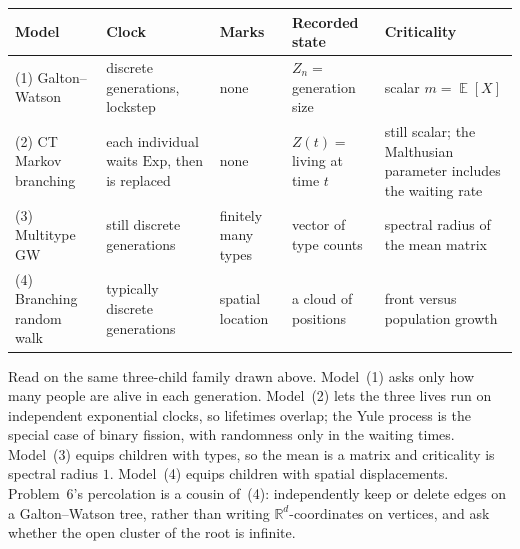 \documentclass[11pt,a4paper]{article}
\DeclareMathOperator{\E}{\mathbb{E}}
\begin{document}
\begin{remark}
{\footnotesize
\setlength{\tabcolsep}{3.5pt}
\renewcommand{\arraystretch}{1.22}
\noindent
\begin{tabularx}{\linewidth}{@{}
  >{\raggedright\arraybackslash}p{2.45cm}
  >{\raggedright\arraybackslash}Y
  >{\raggedright\arraybackslash}Y
  >{\raggedright\arraybackslash}Y
  >{\raggedright\arraybackslash}Y
  @{}}
\toprule
\textbf{Model}
  & \textbf{Clock}
  & \textbf{Marks}
  & \textbf{Recorded state}
  & \textbf{Criticality} \\
\midrule
(1) Galton--Watson
  & discrete generations, lockstep
  & none
  & \(Z_n=\) generation size
  & scalar \(m=\E[X]\) \\
(2) CT Markov branching
  & each individual waits \(\mathrm{Exp}\), then is replaced
  & none
  & \(Z(t)=\) living at time \(t\)
  & still scalar; the Malthusian parameter includes the waiting rate \\
(3) Multitype GW
  & still discrete generations
  & finitely many types
  & vector of type counts
  & spectral radius of the mean matrix \\
(4) Branching random walk
  & typically discrete generations
  & spatial location
  & a cloud of positions
  & front versus population growth \\
\bottomrule
\end{tabularx}
}

Read on the same three-child family drawn above. Model~(1) asks only how many people are alive in each generation. Model~(2) lets the three lives run on independent exponential clocks, so lifetimes overlap; the Yule process is the special case of binary fission, with randomness only in the waiting times. Model~(3) equips children with types, so the mean is a matrix and criticality is spectral radius \(1\). Model~(4) equips children with spatial displacements. Problem~6's percolation is a cousin of~(4): independently keep or delete edges on a Galton--Watson tree, rather than writing \(\mathbb{R}^d\)-coordinates on vertices, and ask whether the open cluster of the root is infinite.
\end{remark}
\end{document}
